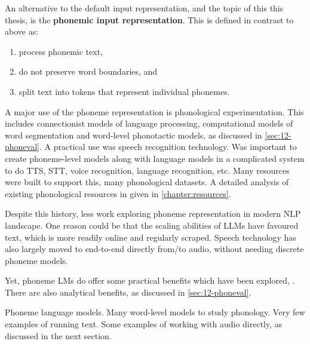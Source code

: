 An alternative to the default input representation, and the topic of this this thesis, is the \textbf{phonemic input representation}. This is defined in contrast to above as:

\begin{enumerate}
    \item process phonemic text,
    \item do not preserve word boundaries, and
    \item split text into tokens that represent individual phonemes.
\end{enumerate}

A major use of the phoneme representation is phonological experimentation. This includes connectionist models of language processing, computational models of word segmentation and word-level phonotactic models, as discussed in \cref{sec:12-phoneval}. A practical use was speech recognition technology. Was important to create phoneme-level models along with language models in a complicated system to do TTS, STT, voice recognition, language recognition, etc. Many resources were built to support this, many phonological datasets. A detailed analysis of existing phonological resources in given in \cref{chapter:resources}.

Despite this history, less work exploring phoneme representation in modern NLP landscape. One reason could be that the scaling abilities of LLMs have favoured text, which is more readily online and regularly scraped. Speech technology has also largely moved to end-to-end directly from/to audio, without needing discrete phoneme models.

Yet, phoneme LMs do offer some practical benefits which have been explored, \writemore. There are also analytical benefits, as discussed in \cref{sec:12-phoneval}.


Phoneme language models. Many word-level models to study phonology. Very few examples of running text. Some examples of working with audio directly, as discussed in the next section.

